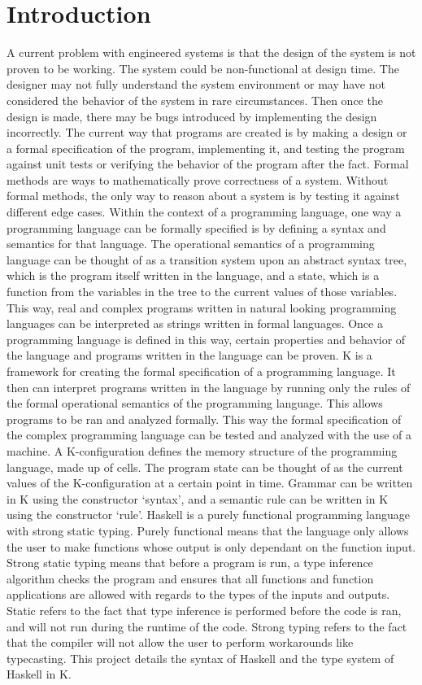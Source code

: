 \chapter{Introduction}
A current problem with engineered systems is that the design of the system is not proven to be working. The system could be non-functional at design time. The designer may not fully understand the system environment or may have not considered the behavior of the system in rare circumstances. Then once the design is made, there may be bugs introduced by implementing the design incorrectly.
The current way that programs are created is by making a design or a formal specification of the program, implementing it, and testing the program against unit tests or verifying the behavior of the program after the fact.
Formal methods are ways to mathematically prove correctness of a system. Without formal methods, the only way to reason about a system is by testing it against different edge cases.
Within the context of a programming language, one way a programming language can be formally specified is by defining a syntax and semantics for that language.
The operational semantics of a programming language can be thought of as a transition system upon an abstract syntax tree, which is the program itself written in the language, and a state, which is a function from the variables in the tree to the current values of those variables. 
This way, real and complex programs written in natural looking programming languages can be interpreted as strings written in formal languages. Once a programming language is defined in this way, certain properties and behavior of the language and programs written in the language can be proven.
K is a framework for creating the formal specification of a programming language. It then can interpret programs written in the language by running only the rules of the formal operational semantics of the programming language. This allows programs to be ran and analyzed formally. This way the formal specification of the complex programming language can be tested and analyzed with the use of a machine.
A K-configuration defines the memory structure of the programming language, made up of cells. The program state can be thought of as the current values of the K-configuration at a certain point in time.
Grammar can be written in K using the constructor ‘syntax’, and a semantic rule can be written in K using the constructor ‘rule’.
Haskell is a purely functional programming language with strong static typing. Purely functional means that the language only allows the user to make functions whose output is only dependant on the function input. Strong static typing means that before a program is run, a type inference algorithm checks the program and ensures that all functions and function applications are allowed with regards to the types of the inputs and outputs. Static refers to the fact that type inference is performed before the code is ran, and will not run during the runtime of the code. Strong typing refers to the fact that the compiler will not allow the user to perform workarounds like typecasting.
This project details the syntax of Haskell and the type system of Haskell in K.
